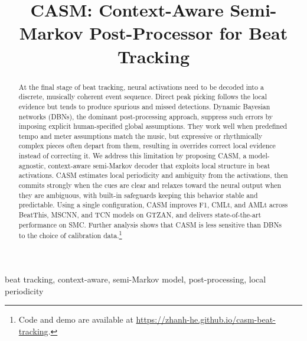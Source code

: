 \documentclass{article}
\title{CASM: Context-Aware Semi-Markov Post-Processor for Beat Tracking}
\begin{document}
\ninept
\maketitle

\begin{abstract}
At the final stage of beat tracking, neural activations need to be decoded into a discrete, musically coherent event sequence. Direct peak picking follows the local evidence but tends to produce spurious and missed detections. Dynamic Bayesian networks (DBNs), the dominant post-processing approach, suppress such errors by imposing explicit human-specified global assumptions. They work well when predefined tempo and meter assumptions match the music, but expressive or rhythmically complex pieces often depart from them, resulting in overrides correct local evidence instead of correcting it. We address this limitation by proposing CASM, a model-agnostic, context-aware semi-Markov decoder that exploits local structure in beat activations. CASM estimates local periodicity and ambiguity from the activations, then commits strongly when the cues are clear and relaxes toward the neural output when they are ambiguous, with built-in safeguards keeping this behavior stable and predictable. Using a single configuration, CASM improves F1, CMLt, and AMLt across BeatThis, MSCNN, and TCN models on GTZAN, and delivers state-of-the-art performance on SMC. Further analysis shows that CASM is less sensitive than DBNs to the choice of calibration data.\footnote{Code and demo are available at \url{https://zhanh-he.github.io/casm-beat-tracking}.}
\end{abstract}

\begin{keywords}
beat tracking, context-aware, semi-Markov model, post-processing, local periodicity
\end{keywords}


\end{document}
